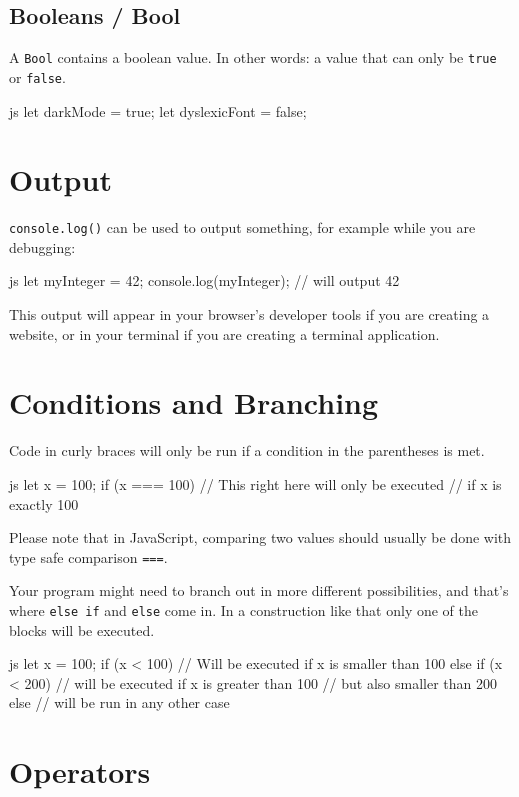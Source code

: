 \documentclass[10pt,a4paper]{article}
\begin{document}
\begin{multicols}{3}
\subsection*{Booleans / Bool}
A \texttt{Bool} contains a boolean value. In other words: a value that can only be \texttt{true} or \texttt{false}.
\begin{codebox}{js}{}
  let darkMode = true;
  let dyslexicFont = false;
\end{codebox}


\section*{Output}
\texttt{console.log()} can be used to output something, for example while you are debugging:
\begin{codebox}{js}{}
let myInteger = 42;
console.log(myInteger); // will output 42
\end{codebox}
This output will appear in your browser's developer tools if you are creating a website, or in your terminal if you are creating a terminal application.


\section*{Conditions and Branching}
Code in curly braces will only be run if a condition in the parentheses is met.

\begin{codebox}{js}{}
  let x = 100;
  if (x === 100) {
    // This right here will only be executed
    // if x is exactly 100
  }
\end{codebox}
Please note that in JavaScript, comparing two values should usually be done with type safe comparison \texttt{===}.

Your program might need to branch out in more different possibilities, and that's where \texttt{else if} and \texttt{else} come in. In a construction like that only one of the blocks will be executed.
\begin{codebox}{js}{}
  let x = 100;
  if (x < 100) {
    // Will be executed if x is smaller than 100
  } else if (x < 200) {
    // will be executed if x is greater than 100
    // but also smaller than 200
  } else {
    // will be run in any other case
  }
\end{codebox}


\section*{Operators}

\end{multicols}
\end{document}
